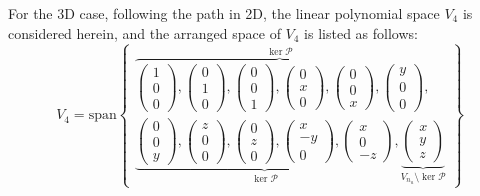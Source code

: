 For the 3D case, following the path in 2D, the linear polynomial space $V_4$ is considered herein, and the arranged space of $V_4$ is listed as follows:
\begin{equation}
V_4 = \mathrm{span}
\begin{Bmatrix}
\overbrace{
\begin{pmatrix} 1 \\ 0 \\ 0 \end{pmatrix},
\begin{pmatrix} 0 \\ 1 \\ 0 \end{pmatrix},
\begin{pmatrix} 0 \\ 0 \\ 1 \end{pmatrix},
\begin{pmatrix} 0 \\ x \\ 0 \end{pmatrix},
\begin{pmatrix} 0 \\ 0 \\ x \end{pmatrix},
\begin{pmatrix} y \\ 0 \\ 0 \end{pmatrix}
}^{\ker \mathcal{P}},
\\
\underbrace{
\begin{pmatrix} 0 \\ 0 \\ y \end{pmatrix},
\begin{pmatrix} z \\ 0 \\ 0 \end{pmatrix},
\begin{pmatrix} 0 \\ z \\ 0 \end{pmatrix},
\begin{pmatrix} x \\ -y \\ 0 \end{pmatrix},
\begin{pmatrix} x \\ 0 \\ -z \end{pmatrix}
}_{\ker \mathcal{P}},
\underbrace{
\begin{pmatrix} x \\ y \\ z \end{pmatrix}
}_{V_{n_u} \setminus \ker \mathcal{P}}
\end{Bmatrix}
\end{equation}

